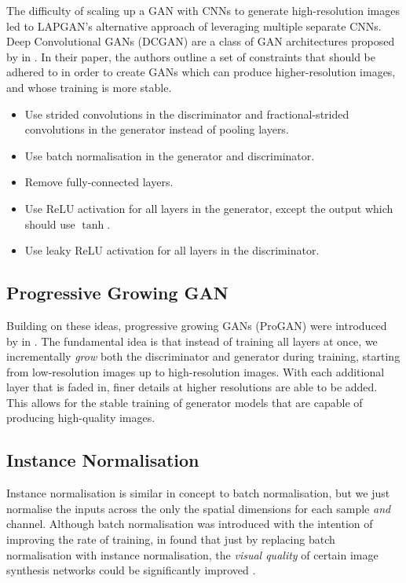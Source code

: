 The difficulty of scaling up a GAN with CNNs to generate high-resolution images led to LAPGAN's alternative approach of leveraging multiple separate CNNs.
Deep Convolutional GANs (DCGAN) are a class of GAN architectures proposed by \citeauthor{dcgan} in \citeyear{dcgan} \cite{dcgan}.
In their paper, the authors outline a set of constraints that should be adhered to in order to create GANs which can produce higher-resolution images, and whose training is more stable.
\begin{itemize}
    \item Use strided convolutions in the discriminator and fractional-strided convolutions in the generator instead of pooling layers.
    \item Use batch normalisation in the generator and discriminator.
    \item Remove fully-connected layers.
    \item Use ReLU activation for all layers in the generator, except the output which should use $\tanh$.
    \item Use leaky ReLU activation for all layers in the discriminator.
\end{itemize}

\subsection{Progressive Growing GAN}

Building on these ideas, progressive growing GANs (ProGAN) were introduced by \citeauthor{DBLP:journals/corr/abs-1710-10196} in \citeyear{DBLP:journals/corr/abs-1710-10196} \cite{DBLP:journals/corr/abs-1710-10196}.
The fundamental idea is that instead of training all layers at once, we incrementally \emph{grow} both the discriminator and generator during training, starting from low-resolution images up to high-resolution images.
With each additional layer that is faded in, finer details at higher resolutions are able to be added.
This allows for the stable training of generator models that are capable of producing high-quality images.

\subsection{Instance Normalisation} 

Instance normalisation is similar in concept to batch normalisation, but we just normalise the inputs across the only the spatial dimensions for each sample \emph{and} channel.
Although batch normalisation was introduced with the intention of improving the rate of training, in \citeyear{instancenorm} \citeauthor{instancenorm} found that just by replacing batch normalisation with instance normalisation, the \emph{visual quality} of certain image synthesis networks could be significantly improved \cite{instancenorm}.

